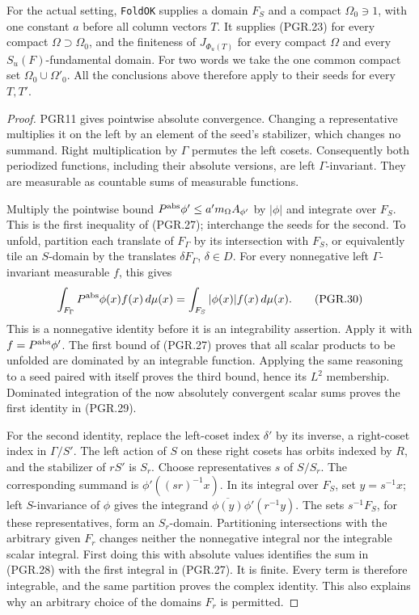 \documentclass[11pt,a4paper]{article}
\numberwithin{equation}{section}
\theoremstyle{remark}\newtheorem{remark}[theorem]{Remark}
\begin{document}
For the actual setting, \texttt{Fold\allowbreak OK} supplies a domain \(F_S\)
and a compact \(\Omega_0\ni1\), with one constant \(a\)
before all column vectors \(T\).  It supplies (PGR.23) for every
compact \(\Omega\supset\Omega_0\), and the finiteness of
\(J_{\Phi_u(T)}\) for every compact \(\Omega\) and every
\(S_u(F)\)-fundamental domain.  For two words we take the one
common compact set \(\Omega_0\cup\Omega'_0\).  All the
conclusions above therefore apply to their seeds for every \(T,T'\).
\begin{proof}
PGR11 gives pointwise absolute convergence.  Changing a representative
multiplies it on the left by an element of the seed's stabilizer,
which changes no summand.  Right multiplication by \(\Gamma\)
permutes the left cosets.  Consequently both periodized functions,
including their absolute versions, are left \(\Gamma\)-invariant.
They are measurable as countable sums of measurable functions.

Multiply the pointwise bound
\(P^{\rm abs}\phi'\leq a'm_\Omega A_{\phi'}\)
by \(|\phi|\) and integrate over \(F_S\).  This is the
first inequality of (PGR.27); interchange the seeds for the second.
To unfold, partition each translate of \(F_\Gamma\) by its
intersection with \(F_S\), or equivalently tile an
\(S\)-domain by the translates \(\delta F_\Gamma\),
\(\delta\in D\).  For every nonnegative left
\(\Gamma\)-invariant measurable \(f\), this gives
\[
 \int_{F_\Gamma}P^{\rm abs}\phi(x) f(x)\,d\mu(x)
                 =\int_{F_S}|\phi(x)|f(x)\,d\mu(x).
\tag{PGR.30}
\]
This is a nonnegative identity before it is an integrability assertion.
Apply it with \(f=P^{\rm abs}\phi'\).  The first bound of
(PGR.27) proves that all scalar products to be unfolded are dominated
by an integrable function.  Applying the same reasoning to a seed
paired with itself proves the third bound, hence its \(L^2\)
membership.  Dominated integration of the now absolutely convergent
scalar sums proves the first identity in (PGR.29).

For the second identity, replace the left-coset index \(\delta'\)
by its inverse, a right-coset index in \(\Gamma/S'\).  The left
action of \(S\) on these right cosets has orbits indexed by
\(R\), and the stabilizer of \(rS'\) is \(S_r\).
Choose representatives \(s\) of \(S/S_r\).  The corresponding
summand is \(\phi'((sr)^{-1}x)\).  In its integral over
\(F_S\), set \(y=s^{-1}x\); left \(S\)-invariance of
\(\phi\) gives the integrand
\(\overline{\phi(y)}\phi'(r^{-1}y)\).
The sets \(s^{-1}F_S\), for these representatives, form an
\(S_r\)-domain.  Partitioning intersections with the arbitrary
given \(F_r\) changes neither the nonnegative integral nor the
integrable scalar integral.  First doing this with absolute values
identifies the sum in (PGR.28) with the first integral in (PGR.27).
It is finite.  Every term is therefore integrable, and the same
partition proves the complex identity.  This also explains why an
arbitrary choice of the domains \(F_r\) is permitted.


\end{proof}
\end{document}

